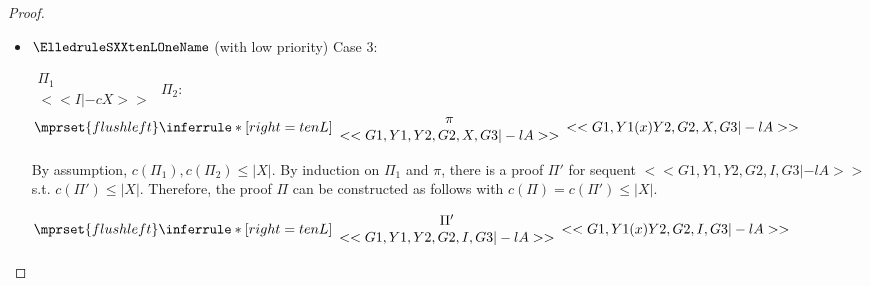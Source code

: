 \begin{proof}
\begin{enumerate}
\begin{itemize}
  \item $\ElledruleSXXtenLOneName$ (with low priority) Case 3:
      \begin{center}
        \scriptsize
        \begin{math}
          \begin{array}{c}
            \Pi_1 \\
            {<<I |-c X>>}
          \end{array}
        \end{math}
        \qquad\qquad
        $\Pi_2$:
        \begin{math}
          $$\mprset{flushleft}
          \inferrule* [right={\tiny tenL}] {
            {
              \begin{array}{c}
                \pi \\
                {<<G1, Y1, Y2, G2, X, G3 |-l A>>}
              \end{array}
            }
          }{<<G1, Y1 (x) Y2, G2, X, G3 |-l A>>}
        \end{math}
      \end{center}
      By assumption, $c(\Pi_1),c(\Pi_2)\leq |X|$. By induction on $\Pi_1$ and $\pi$, there is
      a proof $\Pi'$ for sequent $<<G1, Y1, Y2, G2, I, G3 |-l A>>$ s.t. $c(\Pi') \leq |X|$.
      Therefore, the proof $\Pi$ can be constructed as follows with
      $c(\Pi) = c(\Pi') \leq |X|$.
      \begin{center}
        \scriptsize
        \begin{math}
          $$\mprset{flushleft}
          \inferrule* [right={\tiny tenL}] {
            {
              \begin{array}{c}
                \Pi' \\
                {<<G1, Y1, Y2, G2, I, G3 |-l A>>}
              \end{array}
            }
          }{<<G1, Y1 (x) Y2, G2, I, G3 |-l A>>}
        \end{math}
      \end{center}


\end{itemize}
\end{enumerate}
\end{proof}
